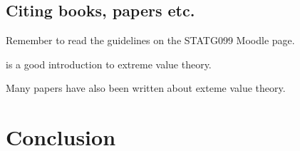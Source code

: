 \documentclass[a4paper,12pt,titlepage]{article} %
\numberwithin{equation}{section}  %
\begin{document}
\subsection{Citing books, papers etc.}
\label{sec:refs}
Remember to read the guidelines on the STATG099 Moodle page.

\citet{Coles2001} is a good introduction to extreme value theory.

Many papers \citep{BCT2000} have also been written about exteme value theory.

\section{Conclusion}

\end{document}
